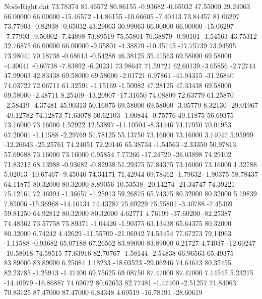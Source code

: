 \begin{filecontents}{NodeRight.dat}
  73.78374   81.46572   80.86155    -0.93682   -0.65032   47.55000   29.24063   66.00000   66.00000  -15.46572  -14.86155  -10.66605   -7.40413
  73.84457   81.06297   73.77903    -0.82938   -0.65032   43.29063   30.99063   66.00000   66.00000  -15.06297   -7.77903   -9.50002   -7.44898
  73.89519   75.55801   70.38879    -0.90101   -1.54563   43.75312   32.76875   66.00000   66.00000   -9.55801   -4.38879  -10.35145  -17.75739
  73.94595   73.98041   70.18738    -0.68613   -0.54288   46.38125   35.41563   69.58000   69.58000   -4.40041   -0.60738   -7.83892   -6.20231
  73.98647   71.59721   62.60139    -3.65856   -2.72744   47.99063   42.83438   69.58000   69.58000   -2.01721    6.97861  -41.94315  -31.26840
  74.03722   72.06711   61.32591    -1.15169   -1.50982   47.28125   47.33438   69.58000   69.58000   -2.48711    8.25409  -13.20907  -17.31650
  74.08809   72.63779   61.25870    -2.58419   -4.37481   45.90313   50.16875   69.58000   69.58000   -3.05779    8.32130  -29.01967  -49.12782
  74.12873   71.63078   60.62103    -1.00844   -0.75776   49.11875   56.69375   73.16000   73.16000    1.52922   12.53897  -11.10504   -8.34446
  74.17950   70.01953   67.20001    -1.11588   -2.29769   51.78125   55.13750   73.16000   73.16000    3.14047    5.95999  -12.26643  -25.25761
  74.24051   72.20146   65.38734    -1.54563   -2.33350   50.97813   57.69688   73.16000   73.16000    0.95854    7.77266  -17.24729  -26.03898
  74.29102   71.83212   68.13988    -0.93682   -0.82938   51.29375   57.84375   73.16000   73.16000    1.32788    5.02013  -10.67467   -9.45046
  74.34171   71.42944   69.78462    -1.79632   -1.90375   58.78437   64.11875   80.32000   80.32000    8.89056   10.53538  -20.14274  -21.34747
  74.39221   75.12161   72.46994    -1.36657   -1.25913   59.26875   65.74375   80.32000   80.32000    5.19839    7.85006  -15.36968  -14.16134
  74.43287   75.69229   75.55801    -3.40788   -7.45469   59.81250   64.92812   80.32000   80.32000    4.62771    4.76199  -37.60200  -82.25387
  74.48362   73.57758   75.89371    -1.04426   -1.90375   63.13438   65.64375   80.32000   80.32000    6.74242    4.42629  -11.55709  -21.06942
  74.53454   77.67273   79.14963    -1.11588   -0.93682   65.07188   67.26562   83.89000   83.89000    6.21727    4.74037  -12.60247  -10.58018
  74.58515   77.63916   82.70767    -1.58144   -2.54838   66.96563   65.49375   83.89000   83.89000    6.25084    1.18233  -18.03523  -29.06246
  74.64613   80.32455   82.23785    -1.25913   -1.47400   69.75625   69.08750   87.47000   87.47000    7.14545    5.23215  -14.40979  -16.86887
  74.69672   80.62653   82.77481    -1.47400   -2.51257   71.84063   70.83125   87.47000   87.47000    6.84348    4.69519  -16.78191  -28.60619

\end{filecontents}
